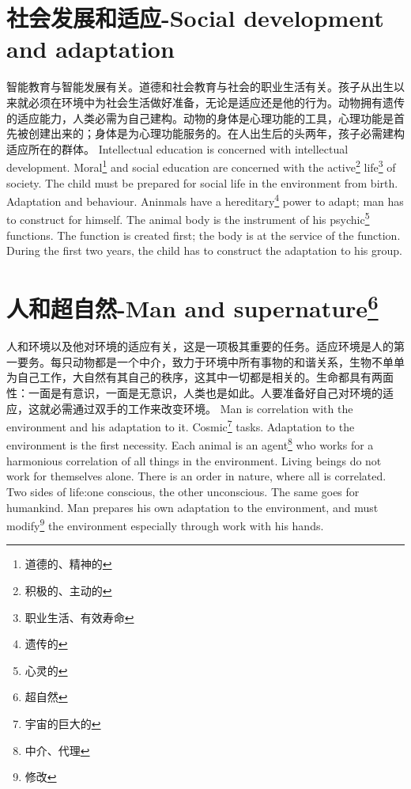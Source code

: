 \documentclass[lang=cn,10pt]{elegantbook}
\begin{document}
\chapter{社会发展和适应-Social development and adaptation}

\begin{tcolorbox}[title=摘要,
colback=red!5!white,
colframe=red!75!black,
fonttitle=\bfseries]
智能教育与智能发展有关。道德和社会教育与社会的职业生活有关。孩子从出生以来就必须在环境中为社会生活做好准备，无论是适应还是他的行为。动物拥有遗传的适应能力，人类必需为自己建构。动物的身体是心理功能的工具，心理功能是首先被创建出来的；身体是为心理功能服务的。在人出生后的头两年，孩子必需建构适应所在的群体。
Intellectual education is concerned with intellectual development. Moral\footnote{道德的、精神的} and social education are concerned with the active\footnote{积极的、主动的} life\footnote{职业生活、有效寿命} of society. The child must be prepared for social life in the environment from birth. Adaptation and behaviour. Aninmals have a hereditary\footnote{遗传的} power to adapt; man has to construct for himself. The animal body is the instrument of his psychic\footnote{心灵的} functions. The function is created first; the body is at the service of the function. During the first two years, the child has to construct the adaptation to his group.
\end{tcolorbox}

\chapter{人和超自然-Man and supernature\footnote{超自然}}

\begin{tcolorbox}[title=摘要,
colback=red!5!white,
colframe=red!75!black,
fonttitle=\bfseries]
人和环境以及他对环境的适应有关，这是一项极其重要的任务。适应环境是人的第一要务。每只动物都是一个中介，致力于环境中所有事物的和谐关系，生物不单单为自己工作，大自然有其自己的秩序，这其中一切都是相关的。生命都具有两面性：一面是有意识，一面是无意识，人类也是如此。人要准备好自己对环境的适应，这就必需通过双手的工作来改变环境。
Man is correlation with the environment and his adaptation to it. Cosmic\footnote{宇宙的巨大的} tasks. Adaptation to the environment is the first necessity. Each animal is an agent\footnote{中介、代理} who works for a harmonious correlation of all things in the environment. Living beings do not work for themselves alone. There is an order in nature, where all is correlated. Two sides of life:one conscious, the other unconscious. The same goes for humankind. Man prepares his own adaptation to the environment, and must modify\footnote{修改} the environment especially through work with his hands.
\end{tcolorbox}
\end{document}
